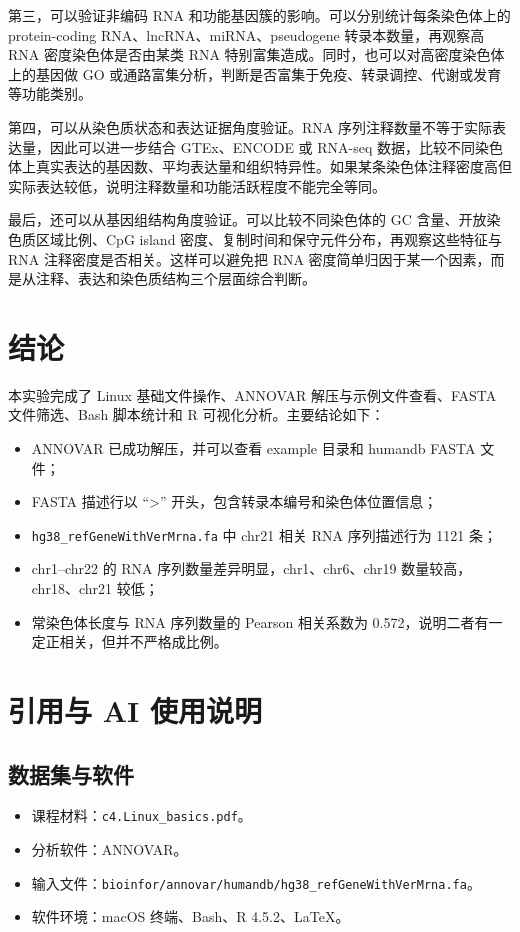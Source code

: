 \documentclass[12pt,a4paper,fontset=fandol]{ctexart}
\begin{document}
第三，可以验证非编码 RNA 和功能基因簇的影响。可以分别统计每条染色体上的 protein-coding RNA、lncRNA、miRNA、pseudogene 转录本数量，再观察高 RNA 密度染色体是否由某类 RNA 特别富集造成。同时，也可以对高密度染色体上的基因做 GO 或通路富集分析，判断是否富集于免疫、转录调控、代谢或发育等功能类别。

第四，可以从染色质状态和表达证据角度验证。RNA 序列注释数量不等于实际表达量，因此可以进一步结合 GTEx、ENCODE 或 RNA-seq 数据，比较不同染色体上真实表达的基因数、平均表达量和组织特异性。如果某条染色体注释密度高但实际表达较低，说明注释数量和功能活跃程度不能完全等同。

最后，还可以从基因组结构角度验证。可以比较不同染色体的 GC 含量、开放染色质区域比例、CpG island 密度、复制时间和保守元件分布，再观察这些特征与 RNA 注释密度是否相关。这样可以避免把 RNA 密度简单归因于某一个因素，而是从注释、表达和染色质结构三个层面综合判断。

\section{结论}

本实验完成了 Linux 基础文件操作、ANNOVAR 解压与示例文件查看、FASTA 文件筛选、Bash 脚本统计和 R 可视化分析。主要结论如下：

\begin{itemize}
  \item ANNOVAR 已成功解压，并可以查看 example 目录和 humandb FASTA 文件；
  \item FASTA 描述行以 ``>'' 开头，包含转录本编号和染色体位置信息；
  \item \texttt{hg38\_refGeneWithVerMrna.fa} 中 chr21 相关 RNA 序列描述行为 1121 条；
  \item chr1--chr22 的 RNA 序列数量差异明显，chr1、chr6、chr19 数量较高，chr18、chr21 较低；
  \item 常染色体长度与 RNA 序列数量的 Pearson 相关系数为 0.572，说明二者有一定正相关，但并不严格成比例。
\end{itemize}

\section{引用与 AI 使用说明}

\subsection{数据集与软件}

\begin{itemize}
  \item 课程材料：\texttt{c4.Linux\_basics.pdf}。
  \item 分析软件：ANNOVAR。
  \item 输入文件：\texttt{bioinfor/annovar/humandb/hg38\_refGeneWithVerMrna.fa}。
  \item 软件环境：macOS 终端、Bash、R 4.5.2、\LaTeX。
\end{itemize}
\end{document}
